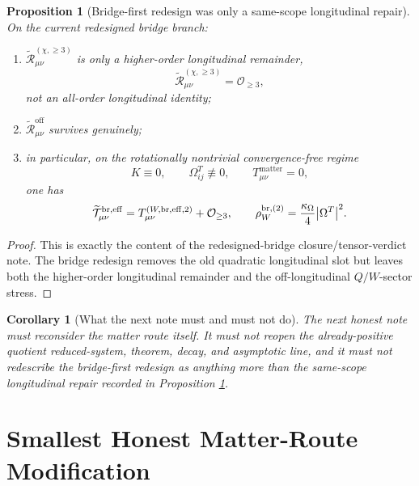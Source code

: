 \documentclass[11pt]{article}
\newcommand{\ReEff}{\widetilde{\mathcal T}_{\mu\nu}^{\mathrm{br,eff}}}
\newcommand{\ReLong}{\widetilde{\mathcal R}_{\mu\nu}^{(\chi,\ge 3)}}
\newcommand{\ReOff}{\widetilde{\mathcal R}_{\mu\nu}^{\mathrm{off}}}
\newtheorem{proposition}{Proposition}
\newtheorem{corollary}{Corollary}
\begin{document}
\begin{proposition}[Bridge-first redesign was only a same-scope longitudinal repair]
\label{prop:narrow}
On the current redesigned bridge branch:
\begin{enumerate}
    \item \(\ReLong\) is only a higher-order longitudinal remainder,
    \begin{equation}
    \ReLong=\mathcal O_{\ge 3},
    \label{eq:long}
    \end{equation}
    not an all-order longitudinal identity;
    \item \(\ReOff\) survives genuinely;
    \item in particular, on the rotationally nontrivial convergence-free regime
    \begin{equation}
    K\equiv 0,
    \qquad
    \Omega_{ij}^T\not\equiv 0,
    \qquad
    T_{\mu\nu}^{\mathrm{matter}}=0,
    \label{eq:rot}
    \end{equation}
    one has
    \begin{equation}
    \ReEff
    =
    T_{\mu\nu}^{(W,\mathrm{br,eff},2)}
    +\mathcal O_{\ge 3},
    \qquad
    \rho_W^{\mathrm{br},(2)}
    =
    \frac{\kappa_\Omega}{4}\abs{\Omega^T}^2.
    \label{eq:oldW}
    \end{equation}
\end{enumerate}
\end{proposition}

\begin{proof}
This is exactly the content of the redesigned-bridge closure/tensor-verdict note. The bridge redesign removes the old quadratic longitudinal slot but leaves both the higher-order longitudinal remainder and the off-longitudinal \(Q/W\)-sector stress.
\end{proof}

\begin{corollary}[What the next note must and must not do]
\label{cor:task}
The next honest note must reconsider the matter route itself. It must not reopen the already-positive quotient reduced-system, theorem, decay, and asymptotic line, and it must not redescribe the bridge-first redesign as anything more than the same-scope longitudinal repair recorded in Proposition \ref{prop:narrow}.
\end{corollary}

\section{Smallest Honest Matter-Route Modification}
\end{document}
